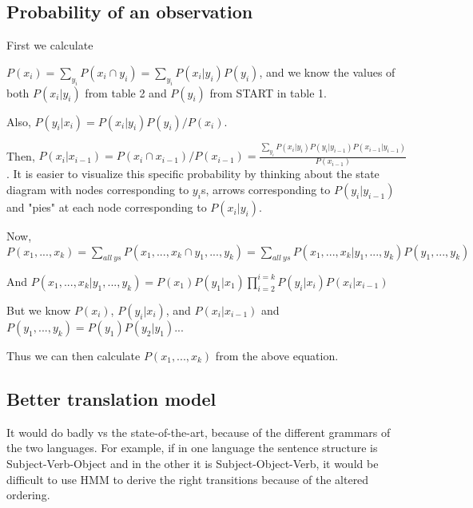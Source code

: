 \documentclass[]{article}
\begin{document}
\subsection{Probability of an observation}

First we calculate 

$P(x_i) = \sum_{y_i} P(x_i \cap y_i) = \sum_{y_i} P(x_i|y_i)P(y_i)$, and we know the values of both $P(x_i|y_i)$ from table 2 and $P(y_i)$ from START in table 1.

Also, $P(y_i|x_i) = P(x_i|y_i)P(y_i)/P(x_i)$.

Then, $P(x_i|x_{i-1}) = P(x_i \cap x_{i-1}) / P(x_{i-1}) = \frac{\sum_{y_i} P(x_i|y_i)P(y_i|y_{i-1})P(x_{i-1}|y_{i-1})}{P(x_{i-1})}$. It is easier to visualize this specific probability by thinking about the state diagram with nodes corresponding to $y_i$s, arrows corresponding to $P(y_i|y_{i-1})$ and "pies" at each node corresponding to $P(x_i|y_i)$.

Now, $P(x_1,...,x_k) = \sum_{all~ys} P(x_1,...,x_k \cap y_1,...,y_k) = \sum_{all~ys}P(x_1,...,x_k|y_1,...,y_k)P(y_1,...,y_k)$

And $P(x_1,...,x_k|y_1,...,y_k) = P(x_1)P(y_1|x_1)\prod_{i=2}^{i=k} P(y_i|x_i)P(x_i|x_{i-1})$

But we know $P(x_i)$, $P(y_i|x_i)$, and $P(x_i|x_{i-1})$ and $P(y_1,...,y_k) = P(y_1)P(y_2|y_1)...$

Thus we can then calculate $P(x_1,...,x_k)$ from the above equation.

\subsection{Better translation model}

It would do badly vs the state-of-the-art, because of the different grammars of the two languages. For example, if in one language the sentence structure is Subject-Verb-Object and in the other it is Subject-Object-Verb, it would be difficult to use HMM to derive the right transitions because of the altered ordering.
\end{document}
